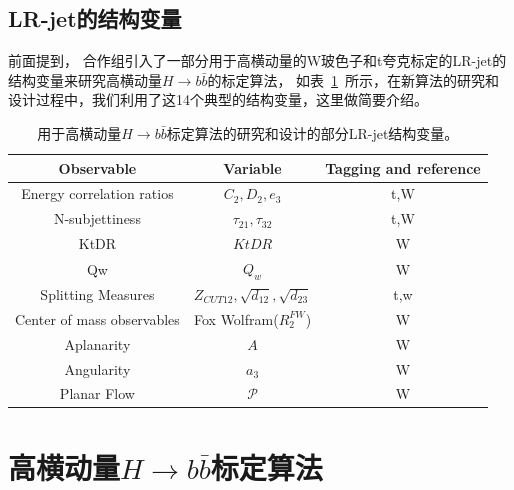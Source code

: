 \subsection{LR-jet的结构变量}
\label{sec:XbbORJSS}


前面提到，
合作组引入了一部分用于高横动量的W玻色子和t夸克标定的LR-jet的结构变量来研究高横动量$H\rightarrow b\bar{b}$的标定算法，
如表~\ref{tab:JS}~所示，在新算法的研究和设计过程中，我们利用了这14个典型的结构变量，这里做简要介绍。

\begin{table}[ht]
\caption{用于高横动量$H\rightarrow b\bar{b}$标定算法的研究和设计的部分LR-jet结构变量。}
\begin{center}
\begin{adjustbox}{width=\columnwidth,center}
\begin{tabular}{c|c|c}
    \hline
    \hline
    Observable & Variable & Tagging and reference \\
    \hline  
    Energy correlation ratios & $C_2,D_2,e_3$ & t,W\cite{JSS1,JSS2} \\
    \hline  
    N-subjettiness & $\tau_{21},\tau_{32}$ & t,W\cite{JSS3,JSS4} \\
    \hline  
    KtDR & $KtDR$ & W\cite{JSS14} \\
    \hline  
    Qw & $Q_w$ & W\cite{JSS8} \\
    \hline  
    Splitting Measures & $Z_{CUT12},\sqrt{d_{12}},\sqrt{d_{23}}$ & t,w\cite{JSS8,JSS10} \\ 
    \hline  
    Center of mass observables & Fox Wolfram($R_2^{FW}$) & W\cite{JSS5}  \\
    \hline  
    Aplanarity & $A$ & W\cite{JSS6} \\
     \hline  
    Angularity & $a_3$ & W\cite{JSS13} \\
    \hline  
    Planar Flow & $\mathcal{P}$& W\cite{JSS11} \\
    \hline
    \hline
\end{tabular}
\end{adjustbox}
\end{center}
\label{tab:JS}
\end{table}




\section{高横动量$H\rightarrow b\bar{b}$标定算法}
\label{sec:XbbTagger}

